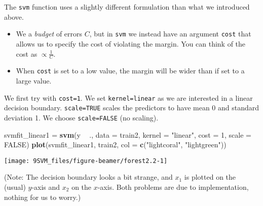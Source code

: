 \documentclass[10pt,ignorenonframetext,]{beamer}
\newenvironment{Shaded}{\begin{snugshade}}{\end{snugshade}}
\newcommand{\DataTypeTok}[1]{\textcolor[rgb]{0.13,0.29,0.53}{#1}}
\newcommand{\DecValTok}[1]{\textcolor[rgb]{0.00,0.00,0.81}{#1}}
\newcommand{\KeywordTok}[1]{\textcolor[rgb]{0.13,0.29,0.53}{\textbf{#1}}}
\newcommand{\NormalTok}[1]{#1}
\newcommand{\OperatorTok}[1]{\textcolor[rgb]{0.81,0.36,0.00}{\textbf{#1}}}
\newcommand{\OtherTok}[1]{\textcolor[rgb]{0.56,0.35,0.01}{#1}}
\newcommand{\StringTok}[1]{\textcolor[rgb]{0.31,0.60,0.02}{#1}}
\begin{document}
\begin{frame}[fragile]

The \texttt{svm} function uses a slightly different formulation than
what we introduced above.

\begin{itemize}
\item
  We a \emph{budget} of errors \(C\), but in \texttt{svm} we instead
  have an argument \texttt{cost} that allows us to specify the cost of
  violating the margin. You can think of the cost as
  \(\propto \frac{1}{C}\).
\item
  When \texttt{cost} is set to a low value, the margin will be wider
  than if set to a large value.
\end{itemize}

\vspace{3mm}

We first try with \texttt{cost=1}. We set
\texttt{kernel=\textquotesingle{}linear\textquotesingle{}} as we are
interested in a linear decision boundary. \texttt{scale=TRUE} scales the
predictors to have mean 0 and standard deviation 1. We choose
\texttt{scale=FALSE} (no scaling).

\end{frame}

\begin{frame}[fragile]

\footnotesize

\begin{Shaded}
\begin{Highlighting}[]
\NormalTok{svmfit_linear1 =}\StringTok{ }\KeywordTok{svm}\NormalTok{(y }\OperatorTok{~}\StringTok{ }\NormalTok{., }\DataTypeTok{data =}\NormalTok{ train2, }\DataTypeTok{kernel =} \StringTok{"linear"}\NormalTok{, }\DataTypeTok{cost =} \DecValTok{1}\NormalTok{, }
    \DataTypeTok{scale =} \OtherTok{FALSE}\NormalTok{)}
\KeywordTok{plot}\NormalTok{(svmfit_linear1, train2, }\DataTypeTok{col =} \KeywordTok{c}\NormalTok{(}\StringTok{"lightcoral"}\NormalTok{, }\StringTok{"lightgreen"}\NormalTok{))}
\end{Highlighting}
\end{Shaded}

\begin{center}\texttt{[image: 9SVM\_files/figure-beamer/forest2.2-1]} \end{center}

(Note: The decision boundary looks a bit strange, and \(x_1\) is plotted
on the (usual) \(y\)-axis and \(x_2\) on the \(x\)-axis. Both problems
are due to implementation, nothing for us to worry.)

\end{frame}
\end{document}
